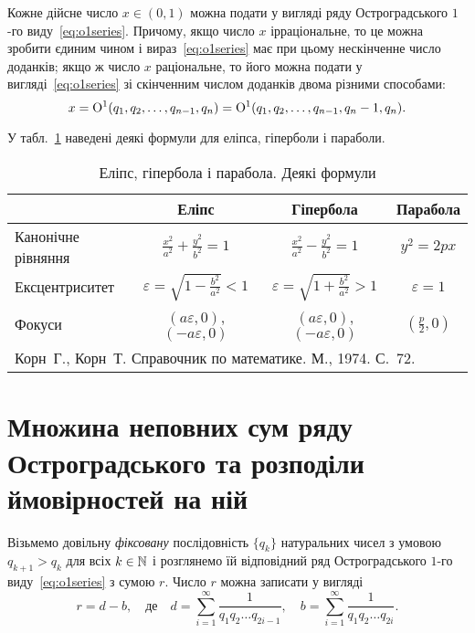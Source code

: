 \begin{theorem}\label{thm:ostrogradsky}
Кожне дійсне число $x\in(0,1)$ можна подати у вигляді ряду
Остроградського $1$-го виду~\eqref{eq:o1series}. Причому, якщо
число $x$ ірраціональне, то це можна зробити єдиним чином і
вираз~\eqref{eq:o1series} має при цьому нескінченне число
доданків; якщо ж число $x$ раціональне, то його можна подати у
вигляді~\eqref{eq:o1series} зі скінченним числом доданків двома
різними способами:
\[
x=\mathrm{O}^{1}(q_1,q_2,\dots,q_{n-1},q_n)=\mathrm{O}^{1}(q_1,q_2,\dots,q_{n-1},q_n-1,q_n).
\]
\end{theorem}

У табл.~\ref{tab:ellipse.hyperbola.parabola} наведені деякі
формули для еліпса, гіперболи і параболи.

\begin{table}[htbp]
\caption{Еліпс, гіпербола і парабола. Деякі формули}
\label{tab:ellipse.hyperbola.parabola}
\begin{tabularx}{\textwidth}{|X|c|c|c|}
\hline
                   & Еліпс                                    & Гіпербола                                & Парабола          \\
\hline
Канонічне рівняння & $\frac{x^2}{a^2}+\frac{y^2}{b^2}=1$      & $\frac{x^2}{a^2}-\frac{y^2}{b^2}=1$      & $y^2=2px$         \\
Ексцентриситет     & $\varepsilon=\sqrt{1-\frac{b^2}{a^2}}<1$ & $\varepsilon=\sqrt{1+\frac{b^2}{a^2}}>1$ & $\varepsilon=1$   \\
Фокуси             & $(a\varepsilon,0)$, $(-a\varepsilon,0)$  & $(a\varepsilon,0)$, $(-a\varepsilon,0)$  & $(\frac{p}{2},0)$ \\
\hline
\multicolumn{4}{|l|}{Корн~Г., Корн~Т. Справочник по математике. М., 1974. С.~72.} \\
\hline
\end{tabularx}
\end{table}


\section{Множина неповних сум ряду Остроградського та розподіли ймовірностей на ній}

Візьмемо довільну \emph{фіксовану} послідовність $\{q_k\}$
натуральних чисел з умовою $q_{k+1}>q_k$ для всіх $k\in\mathbb{N}$ і
розглянемо їй відповідний ряд Остроградського $1$-го
виду~\eqref{eq:o1series} з сумою $r$. Число $r$ можна записати у
вигляді
\begin{equation}
r=d-b, \quad \text{де} \quad d=\sum_{i=1}^\infty
\frac1{q_1q_2\dots q_{2i-1}}, \quad b=\sum_{i=1}^\infty
\frac1{q_1q_2\dots q_{2i}}.
\end{equation}

